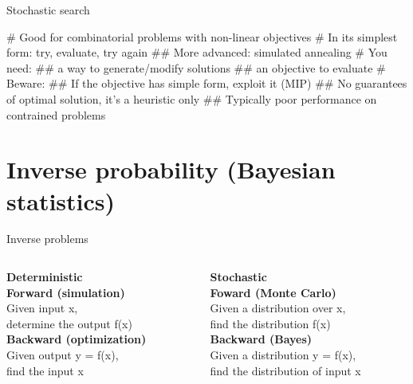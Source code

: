 \documentclass[12pt, aspectratio=149]{beamer}
\theoremstyle{plain}
\begin{document}
\begin{frame}[fragile]{Stochastic search}
	\begin{easylist}[itemize]
		# Good for combinatorial problems with non-linear objectives
		# In its simplest form: try, evaluate, try again
		## More advanced: simulated annealing
		# You need: 
		## a way to generate/modify solutions
		## an objective to evaluate
		# Beware:
		## If the objective has simple form, exploit it (MIP)
		## No guarantees of optimal solution, it's a heuristic only
		## Typically poor performance on contrained problems
	\end{easylist}
\end{frame}




\section{Inverse probability (Bayesian statistics)}

\begin{frame}[fragile]{Inverse problems}
\begin{columns}
\begin{column}{0.5\textwidth}
    \begin{center}
\textbf{Deterministic}\\
\vspace*{2em}
\textbf{Forward (simulation)} \\
Given input x,\\determine the output f(x) \\
\vspace*{1em}
\textbf{Backward (optimization)} \\
Given output y = f(x),\\find the input x
     \end{center}
\end{column}
\begin{column}{0.5\textwidth}  %
    \begin{center}
\textbf{Stochastic}\\
\vspace*{2em}
\textbf{Foward (Monte Carlo)} \\
Given a distribution over x,\\find the distribution f(x) \\
\vspace*{1em}
\textbf{Backward (Bayes)} \\
Given a distribution y = f(x),\\find the distribution of input x
     \end{center}
\end{column}
\end{columns}
\end{frame}
\end{document}
